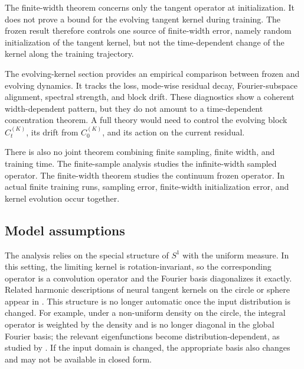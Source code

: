 The finite-width theorem concerns only the tangent operator at initialization.
It does not prove a bound for the evolving tangent kernel during training. The
frozen result therefore controls one source of finite-width error, namely random
initialization of the tangent kernel, but not the time-dependent change of the
kernel along the training trajectory.

The evolving-kernel section provides an empirical comparison between frozen and
evolving dynamics. It tracks the loss, mode-wise residual decay,
Fourier-subspace alignment, spectral strength, and block drift. These
diagnostics show a coherent width-dependent pattern, but they do not amount to a
time-dependent concentration theorem. A full theory would need to control the
evolving block \(C_t^{(K)}\), its drift from \(C_0^{(K)}\), and its action on the
current residual.

There is also no joint theorem combining finite sampling, finite width, and
training time. The finite-sample analysis studies the infinite-width sampled
operator. The finite-width theorem studies the continuum frozen operator. In
actual finite training runs, sampling error, finite-width initialization error,
and kernel evolution occur together.

\subsection{Model assumptions}
\label{subsec:discussion-limitations-model}

The analysis relies on the special structure of \(S^1\) with the uniform
measure. In this setting, the limiting kernel is rotation-invariant, so the
corresponding operator is a convolution operator and the Fourier basis
diagonalizes it exactly. Related harmonic descriptions of neural tangent kernels
on the circle or sphere appear in
\citet{basri2019convergence,basri2020frequencybiasneuralnetworks,bietti2019inductivebiasneuraltangent,cao2020understandingspectralbiasdeep}.
This structure is no longer automatic once the input distribution is changed.
For example, under a non-uniform density on the circle, the integral operator is
weighted by the density and is no longer diagonal in the global Fourier basis;
the relevant eigenfunctions become distribution-dependent, as studied by
\citet{basri2020frequencybiasneuralnetworks}. If the input domain is changed,
the appropriate basis also changes and may not be available in closed form.

